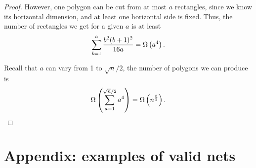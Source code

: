 \documentclass[a4paper,11pt]{article}
\begin{document}
\begin{proof}
However, one polygon can be cut from at most $a$ rectangles, since we know its horizontal dimension, and at least one horizontal side is fixed. Thus, the number of rectangles we get for a given $a$ is at least
\[ \sum\limits_{b=1}^a \frac{b^2 (b+1)^2}{16a} = \Omega\left( a^4 \right). \]

Recall that $a$ can vary from 1 to $\sqrt n / 2$, the number of polygons we can produce is
\[ \Omega \left( \sum\limits_{a=1}^{\sqrt n / 2} a^4 \right) = \Omega \left( n^\frac{5}{2} \right). \]

\end{proof}

\section*{Appendix: examples of valid nets}

% 



% 

{}

\end{document}
